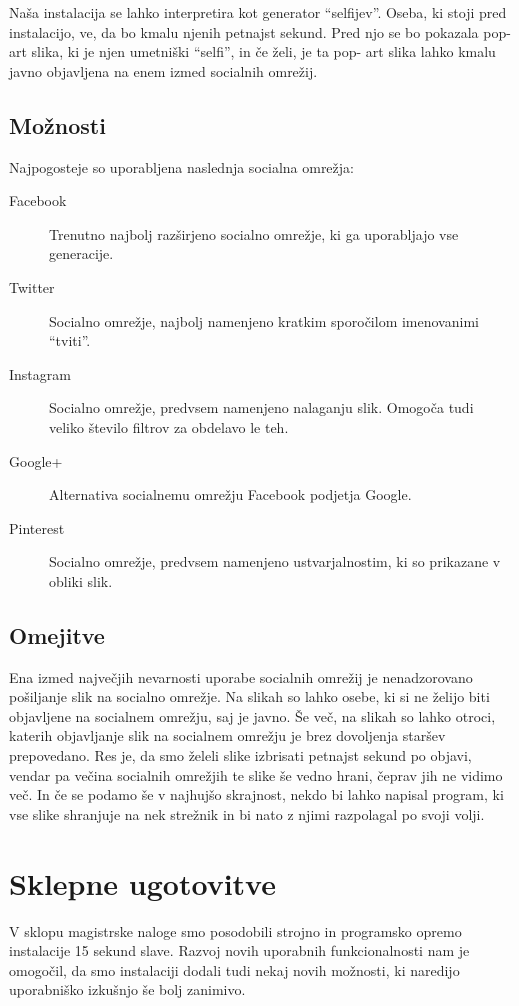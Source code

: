 Naša instalacija se lahko interpretira kot generator ``selfijev''. Oseba, ki
stoji pred instalacijo, ve, da bo kmalu njenih petnajst sekund. Pred njo se bo
pokazala pop-art slika, ki je njen umetniški ``selfi'', in če želi, je ta pop-
art slika lahko kmalu javno objavljena na enem izmed socialnih omrežij.


\section{Možnosti}
Najpogosteje so uporabljena naslednja socialna omrežja:
\begin{description}
\item[Facebook]
Trenutno najbolj razširjeno socialno omrežje, ki ga uporabljajo vse
generacije.

\item[Twitter]
Socialno omrežje, najbolj namenjeno kratkim sporočilom imenovanimi ``tviti''.

\item[Instagram]
Socialno omrežje, predvsem namenjeno nalaganju slik. Omogoča tudi veliko
število filtrov za obdelavo le teh.

\item[Google+]
Alternativa socialnemu omrežju Facebook podjetja Google.

\item[Pinterest]
Socialno omrežje, predvsem namenjeno ustvarjalnostim, ki so prikazane v obliki
slik.
\end{description}


\section{Omejitve}
Ena izmed največjih nevarnosti uporabe socialnih omrežij je nenadzorovano pošiljanje slik na socialno
omrežje. Na slikah so lahko osebe, ki si ne želijo biti objavljene na
socialnem omrežju, saj je javno. Še več, na slikah so lahko otroci, katerih
objavljanje slik na socialnem omrežju je brez dovoljenja staršev prepovedano.
Res je, da smo želeli slike izbrisati petnajst sekund po objavi, vendar pa
večina socialnih omrežjih te slike še vedno hrani, čeprav jih ne vidimo več.
In če se podamo še v najhujšo skrajnost, nekdo bi lahko napisal program, ki
vse slike shranjuje na nek strežnik in bi nato z njimi razpolagal po svoji volji.


\chapter{Sklepne ugotovitve}
V sklopu magistrske naloge smo posodobili strojno in programsko opremo
instalacije 15 sekund slave. Razvoj novih uporabnih funkcionalnosti nam je
omogočil, da smo instalaciji dodali tudi nekaj novih možnosti, ki naredijo
uporabniško izkušnjo še bolj zanimivo.

